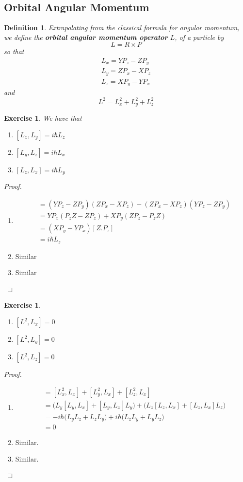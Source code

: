 \documentclass[12pt]{amsart}
\newtheorem{defn}[thm]{Definition}
\newtheorem{ex}[thm]{Exercise}
\begin{document}
\subsection{Orbital Angular Momentum}
\begin{defn}
Extrapolating from the classical formula for angular momentum, we define the \textbf{orbital angular momentum operator} $L$, of a particle by $$L = R \times P$$ so that 
\begin{align*}
L_x = YP_z - ZP_y\\
L_y = ZP_x - XP_z\\
L_z = XP_y - YP_x
\end{align*}
and $$L^2 = L_x^2 + L_y^2 + L_z^2$$
\end{defn}

\begin{ex}
We have that 
\begin{enumerate}
\item $[L_x,L_y] = i \hbar L_z$
\item $[L_y,L_z] = i \hbar L_x$
\item $[L_z,L_x] = i \hbar L_y$
\end{enumerate}
\end{ex}

\begin{proof}\
\begin{enumerate}
\item 
\begin{align*}
[L_x,L_y] 
&= (YP_z -ZP_y)(ZP_x - XP_z) - (ZP_x - XP_z)(YP_z -ZP_y)\\
&= YP_x(P_zZ-ZP_z) + XP_y(ZP_z - P_zZ)\\
&= (XP_y-YP_x)[Z.P_z]\\
&= i \hbar L_z 
\end{align*}
\item Similar
\item Similar
\end{enumerate}
\end{proof}

\begin{ex}\
\begin{enumerate}
\item $[L^2, L_x] = 0$
\item $[L^2, L_y] = 0$
\item $[L^2, L_z] = 0$
\end{enumerate}
\end{ex}

\begin{proof}\
\begin{enumerate}
\item 
\begin{align*}
[L^2, L_x] 
&= [L_x^2, L_x] + [L_y^2, L_x]+ [L_z^2,L_x]\\
&= \big(L_y[L_y,L_x]+[L_y,L_x]L_y\big) + \big(L_z[L_z,L_x]+[L_z,L_x]L_z\big)\\
&=-i \hbar \big(L_yL_z+ L_zL_y\big) + i\hbar\big( L_zL_y+L_yL_z\big)\\
&=0
\end{align*}
\item Similar.
\item Similar.
\end{enumerate}
\end{proof}
\end{document}
